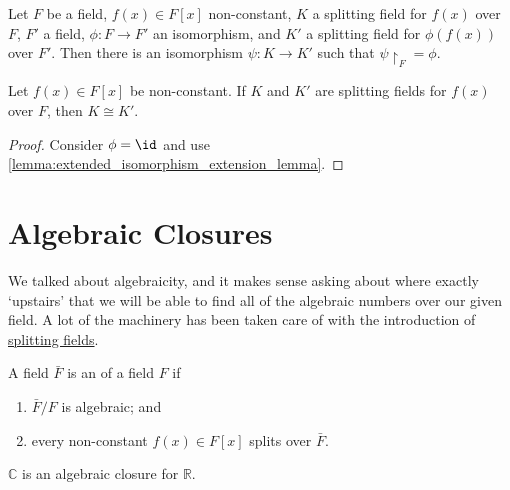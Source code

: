\documentclass[notoc,notitlepage,nobib]{tufte-book}
\begin{document}
\begin{lemma}\label{lemma:extended_isomorphism_extension_lemma}
  Let $F$ be a field, $f(x) \in F[x]$ non-constant, $K$ a splitting field for $f(x)$ over $F$,
  $F'$ a field, $\phi : F \to F'$ an isomorphism, and $K'$ a splitting field for $\phi(f(x))$
  over $F'$. Then there is an isomorphism $\psi : K \to K'$ such that $\psi \restriction_F = \phi$.
\end{lemma}

\begin{crly}\label{crly:splitting_fields_are_unique_up_to_isomorphism}
  Let $f(x) \in F[x]$ be non-constant. If $K$ and $K'$ are splitting fields for $f(x)$ over $F$,
  then $K \cong K'$.
\end{crly}

\begin{proof}
  Consider $\phi = \id$ and use \cref{lemma:extended_isomorphism_extension_lemma}.
\end{proof}


\section{Algebraic Closures}%
\label{sec:algebraic_closures}

We talked about algebraicity, and it makes sense asking about where exactly `upstairs' that
we will be able to find all of the algebraic numbers over our given field. A lot of the
machinery has been taken care of with the introduction of 
\hyperref[sec:splitting_fields]{splitting fields}.

\begin{defn}\label{defn:algebraic_closures}
  A field $\bar{F}$ is an  of a field $F$ if
  \begin{enumerate}
    \item $\bar{F} / F$ is algebraic; and
    \item every non-constant $f(x) \in F[x]$ splits over $\bar{F}$.
  \end{enumerate}
\end{defn}

\begin{eg}
  $\mathbb{C}$ is an algebraic closure for $\mathbb{R}$.
\end{eg}
\end{document}
